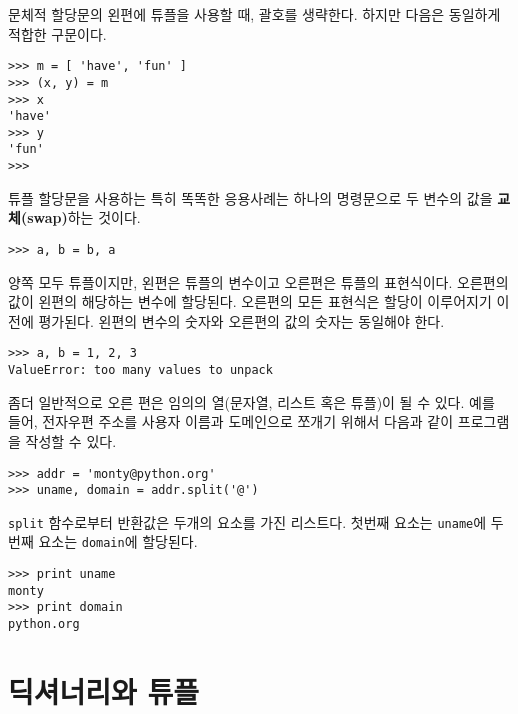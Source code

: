문체적 할당문의 왼편에 튜플을 사용할 때, 괄호를 생략한다. 하지만 다음은 동일하게 적합한 구문이다.

\beforeverb
\begin{verbatim}
>>> m = [ 'have', 'fun' ]
>>> (x, y) = m
>>> x
'have'
>>> y
'fun'
>>> 
\end{verbatim}
\afterverb
%
튜플 할당문을 사용하는 특히 똑똑한 응용사례는 하나의 명령문으로 두 변수의 값을 {\bf 교체(swap)}하는 것이다.

\beforeverb
\begin{verbatim}
>>> a, b = b, a
\end{verbatim}
\afterverb
%

양쪽 모두 튜플이지만, 왼편은 튜플의 변수이고 오른편은 튜플의 표현식이다.
오른편의 값이 왼편의 해당하는 변수에 할당된다. 오른편의 모든 표현식은 할당이 이루어지기 이전에 평가된다.
왼편의 변수의 숫자와 오른편의 값의 숫자는 동일해야 한다.


\beforeverb
\begin{verbatim}
>>> a, b = 1, 2, 3
ValueError: too many values to unpack
\end{verbatim}
\afterverb
%

좀더 일반적으로 오른 편은 임의의 열(문자열, 리스트 혹은 튜플)이 될 수 있다.
예를 들어, 전자우편 주소를 사용자 이름과 도메인으로 쪼개기 위해서 다음과 같이 프로그램을 작성할 수 있다.


\beforeverb
\begin{verbatim}
>>> addr = 'monty@python.org'
>>> uname, domain = addr.split('@')
\end{verbatim}
\afterverb
%

{\tt split} 함수로부터 반환값은 두개의 요소를 가진 리스트다. 
첫번째 요소는 {\tt uname}에 두번째 요소는 {\tt domain}에 할당된다.

\beforeverb
\begin{verbatim}
>>> print uname
monty
>>> print domain
python.org
\end{verbatim}
\afterverb
%

\section{딕셔너리와 튜플}


